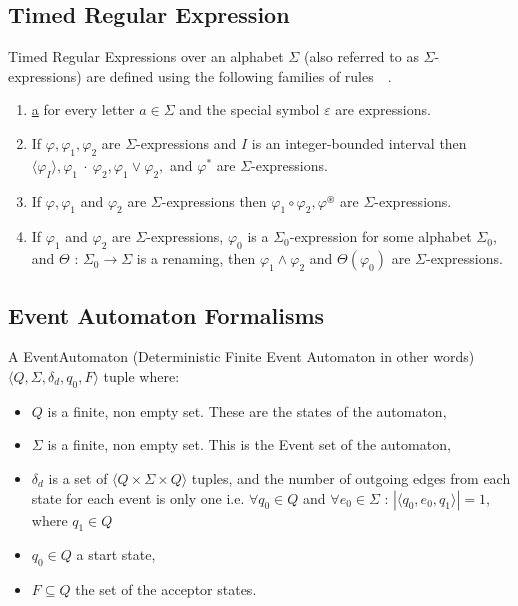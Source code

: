 		\subsection{Timed Regular Expression}
			\begin{dfn}
				Timed Regular Expressions over an alphabet $\Sigma$ (also referred to as $\Sigma$-expressions)
				are defined using the following families of rules~\citep{tre}~.
				\begin{enumerate}
					\item \underline{a} for every letter $a \in \Sigma$ and the special symbol $\varepsilon$ are expressions.
					\item If $\varphi, \varphi_1, \varphi_2$ are $\Sigma$-expressions and $I$ is an integer-bounded interval then
						$\langle\varphi_I\rangle, \varphi_1~\cdot~\varphi_2, \varphi_1 \vee \varphi_2,$ and $\varphi^\ast$ are $\Sigma$-expressions.
					\item If $\varphi, \varphi_1$ and $\varphi_2$ are $\Sigma$-expressions then $\varphi_1 \circ \varphi_2, \varphi^\circledast$ are
						$\Sigma$-expressions.
					\item If $\varphi_1$ and $\varphi_2$ are $\Sigma$-expressions, $\varphi_0$ is a $\Sigma_0$-expression
						for some alphabet $\Sigma_0$, and $\Theta$ : $\Sigma_0 \rightarrow \Sigma$ is
						a renaming, then $\varphi_1 \wedge \varphi_2$ and $\Theta(\varphi_0)$ are $\Sigma$-expressions.
				\end{enumerate}
			\end{dfn}
				
		\subsection{Event Automaton Formalisms}
			\begin{dfn}
				\label{dfn:cep:dfea}
				A EventAutomaton (Deterministic Finite Event Automaton in other words) $\langle Q,\Sigma,\delta_d,q_0, F \rangle$ tuple where: %
					\begin{itemize}
						\item $Q$ is a finite, non empty set. These are the states of the automaton,
						\item $\Sigma$ is a finite, non empty set. This is the Event set of the automaton,
						\item $\delta_d$ is a set of $\langle Q \times \Sigma \times Q \rangle$ tuples,
							and the number of outgoing edges from each state for each event is only one 
							i.e. $\forall q_0 \in Q$ and $\forall e_0 \in \Sigma$ : $|\langle q_0, e_0, q_1 \rangle| = 1$, where $q_1 \in Q$ 
						\item $q_0 \in Q$ a start state,
						\item $F \subseteq Q$ the set of the acceptor states.
					\end{itemize}
				
			\end{dfn}
			
